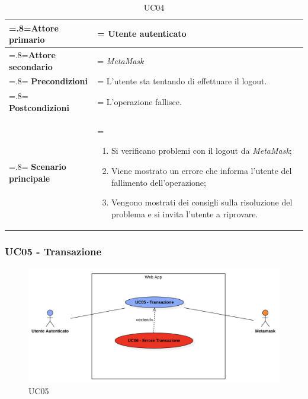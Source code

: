                 \begin{table}[H]
                    \centering
                    \renewcommand{\arraystretch}{1.8}
                    \renewcommand\tabularxcolumn[1]{m{#1}}
                    \begin{tabularx}{0.9\textwidth} {
                        >{\hsize=.8\hsize\linewidth=\hsize}X
                        >{\hsize=1.2\hsize\linewidth=\hsize}X}
                        \hline
                        \textbf{Attore primario} & Utente autenticato \\
                        \hline
                        \textbf{Attore secondario} & \textit{MetaMask} \\
                        \hline
                        \textbf{Precondizioni} & L'utente sta tentando di effettuare il logout. \\
                        \hline
                        \textbf{Postcondizioni} & L'operazione fallisce. \\
                        \hline
                        \textbf{Scenario principale} &
                            \begin{enumerate}
                                \item Si verificano problemi con il logout da \textit{MetaMask};
                                \item Viene mostrato un errore che informa l'utente del fallimento dell'operazione;
                                \item Vengono mostrati dei consigli sulla risoluzione del problema e si invita
                                l'utente a riprovare.
                            \end{enumerate} \\
                        \hline
                    \end{tabularx}
                    \caption{UC04}
                \end{table}

            \subsubsection{UC05 - Transazione}
            \label{UC05}
    
                \begin{figure}[H]
                    \centering
                    \includegraphics[scale=0.6]{src/img/UC05.png}
                    \caption{UC05}
                \end{figure}
    
